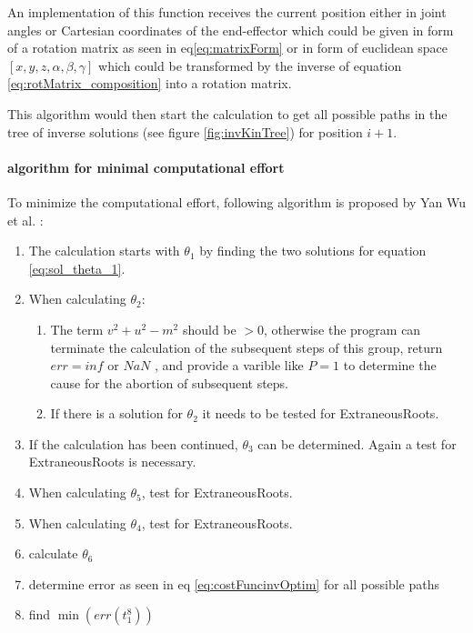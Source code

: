 An implementation of this function receives the current position either in joint angles or Cartesian coordinates of the end-effector which could be given in form of a rotation matrix as seen in eq\ref{eq:matrixForm} or in form of euclidean space $[x,y,z, \alpha, \beta, \gamma]$ which could be transformed by the inverse of equation \ref{eq:rotMatrix_composition} into a rotation matrix.

This algorithm would then start the calculation to get all possible paths in the tree of inverse solutions (see figure \ref{fig:invKinTree}) for position ${i+1}$.

\paragraph{algorithm for minimal computational effort}

To minimize the computational effort, following algorithm is proposed by Yan Wu et al. \cite{invKinSolYanWu}:

\begin{enumerate}
	\item The calculation starts with $\theta_1$ by finding the two solutions for equation \ref{eq:sol_theta_1}.
	\item When calculating $\theta_2$:
	\begin{enumerate}
		\item  The term $ v^2 + u^2 - m^2 $ should be $ > 0$, otherwise the program can terminate the calculation of the subsequent steps of this group, return $err = inf $ or $NaN $ , and provide a varible like $P=1$ to determine the cause for the abortion of subsequent steps.
		\item If there is a solution for $\theta_2$ it needs to be tested for \glspl{ExtraneousRoot}. 
	\end{enumerate}
	\item If the calculation has been continued, $\theta_3$ can be determined. Again a test for \glspl{ExtraneousRoot} is necessary.
	\item When calculating $\theta_5$, test for \glspl{ExtraneousRoot}.
	\item When calculating $\theta_4$, test for \glspl{ExtraneousRoot}.
	\item calculate $\theta_6$
	\item determine error as seen in eq \ref{eq:costFuncinvOptim} for all possible paths
	\item find $\min ( err(t_1^8))$ 
\end{enumerate}

